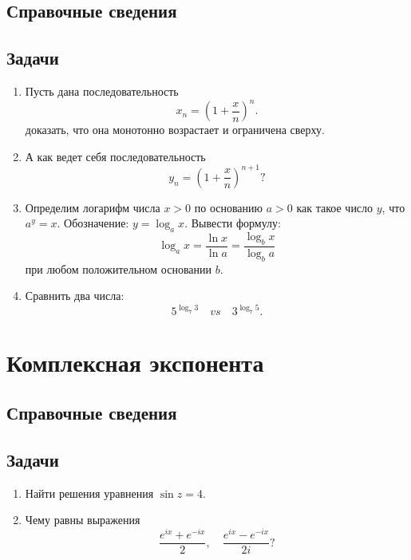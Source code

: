 \subsection*{Справочные сведения}

\subsection*{Задачи}

\begin{enumerate}
\item Пусть дана последовательность
$$
x_n = \left(1+\frac xn\right)^n.
$$
доказать, что она монотонно возрастает и ограничена сверху.
\item А как ведет себя последовательность
$$
y_n = \left(1+\frac xn\right)^{n+1}?
$$
\item Определим логарифм числа $x>0$ по основанию $a>0$ как такое число $y$, что $a^y=x$. Обозначение: $y=\log_a x$. Вывести формулу:
$$
\log_a x = \frac{\ln x}{\ln a} = \frac{\log_b x}{\log_b a}
$$
при любом положительном основании $b$.
\item Сравнить два числа:
$$
5^{\log_7 3}\quad vs\quad   3^{\log_7 5}.
$$

\end{enumerate}



\section{Комплексная экспонента}

\subsection*{Справочные сведения}

\subsection*{Задачи}
\begin{enumerate}
\item Найти решения уравнения $\sin z=4$.
\item Чему равны выражения
$$
\frac{e^{ix}+e^{-ix}}{2},\quad \frac{e^{ix}-e^{-ix}}{2i}?
$$
\end{enumerate}



